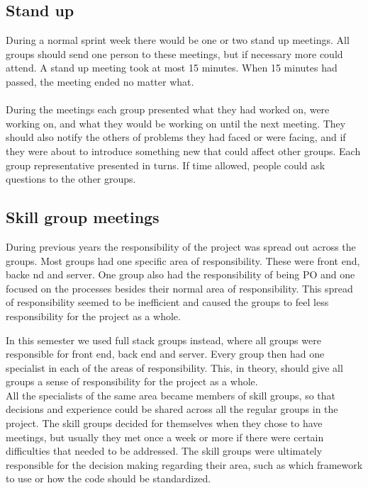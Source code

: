 \subsection{Stand up}
During a normal sprint week there would be one or two stand up meetings.
All groups should send one person to these meetings, but if necessary more could attend.
A stand up meeting took at most 15 minutes.
When 15 minutes had passed, the meeting ended no matter what.
\\
\\
During the meetings each group presented what they had worked on, were working on, and what they would be working on until the next meeting.
They should also notify the others of problems they had faced or were facing, and if they were about to introduce something new that could affect other groups.
Each group representative presented in turns. 
If time allowed, people could ask questions to the other groups.

\subsection{Skill group meetings}
During previous years the responsibility of the project was spread out across the groups.
Most groups had one specific area of responsibility.
These were front end, backe nd and server.
One group also had the responsibility of being PO and one focused on the processes besides their normal area of responsibility.
This spread of responsibility seemed to be inefficient and caused the groups to feel less responsibility for the project as a whole.
\newline
\newline

In this semester we used full stack groups instead, where all groups were responsible for front end, back end and server.
Every group then had one specialist in each of the areas of responsibility.
This, in theory, should give all groups a sense of responsibility for the project as a whole.\\
All the specialists of the same area became members of skill groups, so that decisions and experience could be shared across all the regular groups in the project.
The skill groups decided for themselves when they chose to have meetings, but usually they met once a week or more if there were certain difficulties that needed to be addressed.
The skill groups were ultimately responsible for the decision making regarding their area, such as which framework to use or how the code should be standardized.


